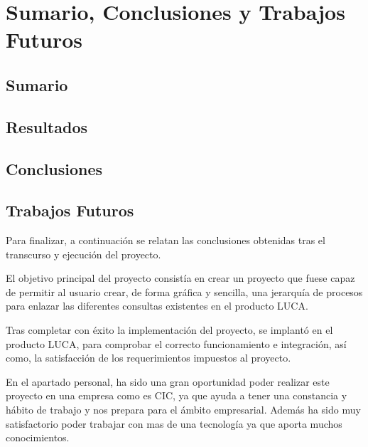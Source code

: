 \chapter{Sumario, Conclusiones y Trabajos Futuros}


\section{Sumario}


\section{Resultados}


\section{Conclusiones}


\section{Trabajos Futuros}


Para finalizar, a continuación se relatan las conclusiones obtenidas tras el transcurso y ejecución del proyecto.
	
	
El objetivo principal del proyecto consistía en crear un proyecto que fuese capaz de permitir al usuario crear, de forma gráfica y sencilla, una jerarquía de procesos para enlazar las diferentes consultas existentes en el producto LUCA.
	
	
Tras completar con éxito la implementación del proyecto, se implantó en el producto LUCA, para comprobar el correcto funcionamiento e integración, así como, la satisfacción de los requerimientos impuestos al proyecto.
	
	
En el apartado personal, ha sido una gran oportunidad poder realizar este proyecto en una empresa como es CIC, ya que ayuda a tener una constancia y hábito de trabajo y nos prepara para el ámbito empresarial. Además ha sido muy satisfactorio poder trabajar con mas de una tecnología ya que aporta muchos conocimientos.


	